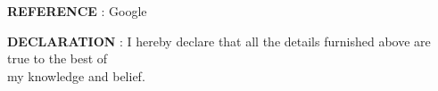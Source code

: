 \documentclass{article}
\begin{document}
 \begin{flushleft}
 	\vspace{0.2in}
 	\textbf{REFERENCE} \hspace{0.30in} : Google
 \end{flushleft}
 
 \begin{flushleft}
 	\vspace{0.2in}
 	\textbf{DECLARATION} \hspace{0.30in} : I hereby declare that all the details furnished above are true to the best of\\ 
 	\hspace{1.6in} my knowledge and belief.
 \end{flushleft}
 
 
\end{document}
